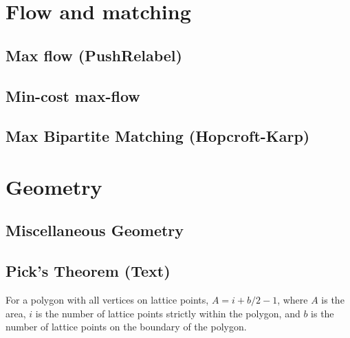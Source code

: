 \documentclass[12pt]{extarticle}
\begin{document}
\begin{multicols*}{2}
\setlength{\parskip}{0.0in}
\setlength{\parskip}{0.0in}
\section{Flow and matching}

\subsection{Max flow (PushRelabel)} %


\subsection{Min-cost max-flow}


\subsection{Max Bipartite Matching (Hopcroft-Karp)} %


\section{Geometry}

\subsection{Miscellaneous Geometry} %



% 

\subsection{Pick's Theorem (Text)} %
For a polygon with all vertices on lattice points, $A = i + b/2 - 1$, where $A$
is the area, $i$ is the number of lattice points strictly within the polygon,
and $b$ is the number of lattice points on the boundary of the polygon.



\end{multicols*}
\end{document}
